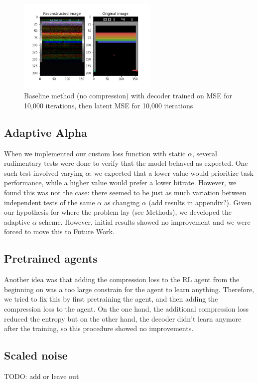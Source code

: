 \begin{figure}[H]
    \centering
    \includegraphics[width=0.6\textwidth]{images/orig_reconstructed_rl3.0.png}
    \caption{Baseline method (no compression) with decoder trained on MSE for 10,000 iterations, then latent MSE for 10,000 iterations}
    \label{fig:baseline_MSE_latent}
\end{figure}

\subsection{Adaptive Alpha}
When we implemented our custom loss function with static $\alpha$, several
rudimentary tests were done to verify that the model behaved as expected. One
such test involved varying $\alpha$: we expected that a lower value would
prioritize task performance, while a higher value would prefer a lower bitrate.
However, we found this was not the case: there seemed to be just as much
variation between independent tests of the same $\alpha$ as changing $\alpha$
(add results in appendix?). Given our hypothesis for where the problem lay (see
Methods), we developed the adaptive $\alpha$ scheme. However, initial results
showed no improvement and we were forced to move this to Future Work.

\subsection{Pretrained agents}
Another idea was that adding the compression loss to the RL agent from the
beginning on was a too large constrain for the agent to learn anything.
Therefore, we tried to fix this by first pretraining the agent, and then adding
the compression loss to the agent. On the one hand, the additional compression
loss reduced the entropy but on the other hand, the decoder didn't learn
anymore after the training, so this procedure showed no improvements.

\subsection{Scaled noise}
TODO: add or leave out


